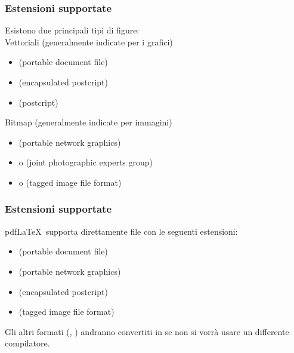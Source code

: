 \documentclass[svgnames,%
	ucs,%
	pdftex]{guitbeamer}
\begin{document}
\begin{frame}
  \frametitle{Estensioni supportate}
	Esistono due principali tipi di figure:\\
  \bigskip
	Vettoriali (generalmente indicate per i grafici)
	\begin{itemize}
		\item {} (portable document file) 
		\item {} (encapsulated postcript) 
		\item {} (postcript) 
	\end{itemize}
  \bigskip
	Bitmap (generalmente indicate per immagini)
	\begin{itemize}
		\item {} (portable network graphics)
		\item {} o  (joint photographic experts group) 
		\item {} o  (tagged image file format) 
	\end{itemize}
\end{frame}
\begin{frame}
  \frametitle{Estensioni supportate}
	pdf\LaTeX\ supporta direttamente file con le seguenti estensioni:
	\begin{itemize}
		\item {} (portable document file) 
		\item {} (portable network graphics)
		\item {} (encapsulated postcript) 
		\item {} (tagged image file format) 
	\end{itemize}
  \medskip
	Gli altri formati (, ) andranno convertiti in  se non si vorr\`a usare un differente compilatore.
\end{frame}
\end{document}
